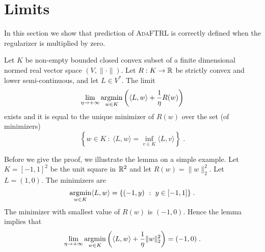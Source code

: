 \section{Limits}
\label{section:limits}

In this section we show that prediction of \textsc{AdaFTRL} is correctly
defined when the regularizer is multiplied by zero.

\begin{lemma}
\label{lemma:prediction-limit-existence}
Let $K$ be non-empty bounded closed convex subset of a finite dimensional normed real vector space $(V, \|\cdot\|)$.
Let $R:K \to \mathbb{R}$ be strictly convex and lower semi-continuous, and let $L \in V^*$. The limit
\begin{equation}
\label{equation:limit}
\lim_{\eta \to +\infty}
\operatorname*{argmin}_{w \in K} \left( \langle L, w \rangle + \frac{1}{\eta} R(w) \right)
\end{equation}
exists and it is equal to the unique minimizer of $R(w)$ over the set (of minimizers)
$$
\left\{ w \in K ~:~ \langle L, w \rangle = \inf_{v \in K} \langle L, v \rangle \right\} \; .
$$
\end{lemma}

Before we give the proof, we illustrate the lemma on a simple
example.  Let $K = [-1,1]^2$ be the unit square in $\mathbb{R}^2$ and let
$R(w) = \|w\|_2^2$. Let $L = (1,0)$. The minimizers are
$$
\operatorname*{argmin}_{w \in K} \langle L, w \rangle = \{ (-1,y) ~:~ y \in [-1,1] \} \; .
$$
The minimizer with smallest value of $R(w)$ is $(-1,0)$. Hence the lemma implies
that
$$
\lim_{\eta \to +\infty} \operatorname*{argmin}_{w \in K}
\left( \langle L, w \rangle + \frac{1}{\eta} \|w\|_2^2 \right) = (-1, 0) \; .
$$


